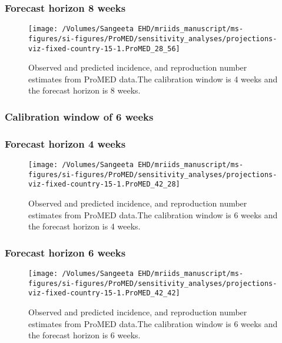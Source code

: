 \documentclass[11pt,]{article}
\begin{document}
\hypertarget{forecast-horizon-8-weeks-10}{%
  \subsubsection{Forecast horizon 8 weeks}\label{forecast-horizon-8-weeks-10}}

\begin{figure}

  {
    \centering
    \texttt{[image: /Volumes/Sangeeta EHD/mriids\_manuscript/ms-figures/si-figures/ProMED/sensitivity\_analyses/projections-viz-fixed-country-15-1.ProMED\_28\_56]} 
  }
  \caption{Observed and predicted incidence, and reproduction number
    estimates from ProMED data.The calibration window is 4 weeks and
    the forecast horizon is 8 weeks.}
  \label{fig:pm48gamma}
\end{figure}

\hypertarget{calibration-window-of-6-weeks-3}{%
  \subsubsection{Calibration window of 6 weeks}\label{calibration-window-of-6-weeks-3}}

\hypertarget{forecast-horizon-4-weeks-10}{%
  \subsubsection{Forecast horizon 4 weeks}\label{forecast-horizon-4-weeks-10}}

\begin{figure}

  {
    \centering \texttt{[image: /Volumes/Sangeeta EHD/mriids\_manuscript/ms-figures/si-figures/ProMED/sensitivity\_analyses/projections-viz-fixed-country-15-1.ProMED\_42\_28]} 

  }

  \caption{Observed and predicted incidence, and reproduction number
    estimates from ProMED data.The calibration window is 6 weeks and
    the forecast horizon is 4 weeks.}
  \label{fig:pm64gamma }
\end{figure}

\hypertarget{forecast-horizon-6-weeks-11}{%
  \subsubsection{Forecast horizon 6 weeks}\label{forecast-horizon-6-weeks-11}}

\begin{figure}

  {\centering \texttt{[image: /Volumes/Sangeeta EHD/mriids\_manuscript/ms-figures/si-figures/ProMED/sensitivity\_analyses/projections-viz-fixed-country-15-1.ProMED\_42\_42]} 

  }
  \caption{Observed and predicted incidence, and reproduction number
    estimates from ProMED data.The calibration window is 6 weeks and
    the forecast horizon is 6 weeks.}
  \label{fig:pm66gamma}
\end{figure}
\end{document}
